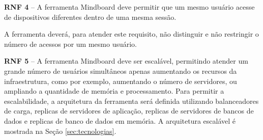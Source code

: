 \textbf{RNF 4} – A ferramenta Mindboard deve permitir que um mesmo usuário acesse de dispositivos diferentes dentro de uma mesma sessão. 

A ferramenta deverá, para atender este requisito, não distinguir e não restringir o número de acessos por um mesmo usuário.

\textbf{RNF 5} – A ferramenta Mindboard deve ser escalável, permitindo atender um grande número de usuários simultâneos apenas aumentando os recursos da infraestrutura, como por exemplo, aumentando o número de servidores, ou ampliando a quantidade de memória e processamento.  Para permitir a escalabilidade, a arquitetura da ferramenta será definida utilizando balanceadores de carga, replicas de servidores de aplicação, replicas de servidores de bancos de dados e replicas de banco de dados em memória. A arquitetura escalável é mostrada na Seção \ref{sec:tecnologias}.